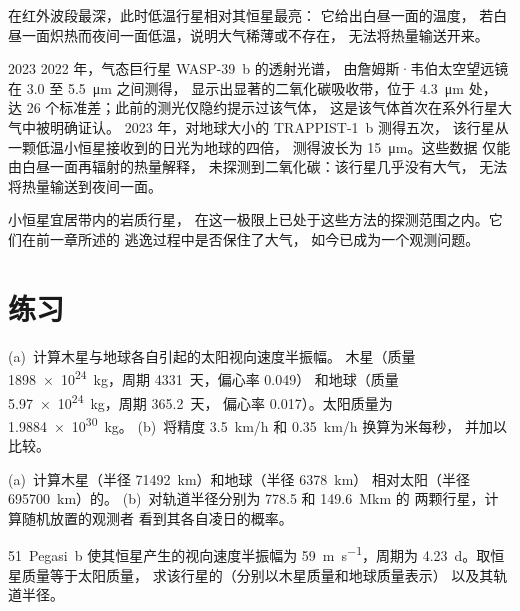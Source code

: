 在红外波段最深，此时低温行星相对其恒星最亮：
它给出白昼一面的温度，
若白昼一面炽热而夜间一面低温，说明大气稀薄或不存在，
无法将热量输送开来。

\begin{dated}{2023}
2022 年，气态巨行星 WASP-39~b 的透射光谱，
由詹姆斯·韦伯太空望远镜在 3.0 至 \qty{5.5}{\micro m} 之间测得，
显示出显著的二氧化碳吸收带，位于 \qty{4.3}{\micro m} 处，
达 26 个标准差；此前的测光仅隐约提示过该气体，
这是该气体首次在系外行星大气中被明确证认。
2023 年，对地球大小的 TRAPPIST-1~b 测得五次，
该行星从一颗低温小恒星接收到的日光为地球的四倍，
测得波长为 \qty{15}{\micro m}。这些数据
仅能由白昼一面再辐射的热量解释，
未探测到二氧化碳：该行星几乎没有大气，
无法将热量输送到夜间一面。
\end{dated}

小恒星宜居带内的岩质行星，
在这一极限上已处于这些方法的探测范围之内。它们在前一章所述的
逃逸过程中是否保住了大气，
如今已成为一个观测问题。

\section{练习}

\begin{exercise}[$\star$]\label{exo:b3:exoplanets:1}
(a)~计算木星与地球各自引起的太阳视向速度半振幅。
木星（质量 \qty{1898e24}{kg}，周期 \num{4331}~天，偏心率 0.049）
和地球（质量 \qty{5.97e24}{kg}，周期 \num{365.2}~天，
偏心率 0.017）。太阳质量为 \qty{1.9884e30}{kg}。
(b)~将精度 \qty{3.5}{km/h} 和 \qty{0.35}{km/h} 换算为米每秒，
并加以比较。
\end{exercise}

\begin{exercise}[$\star$]\label{exo:b3:exoplanets:2}
(a)~计算木星（半径 \qty{71492}{km}）和地球（半径 \qty{6378}{km}）
相对太阳（半径 \qty{695700}{km}）的。
(b)~对轨道半径分别为 \num{778.5} 和 \qty{149.6}{\mega km} 的
两颗行星，计算随机放置的观测者
看到其各自凌日的概率。
\end{exercise}

\begin{exercise}[$\star$]\label{exo:b3:exoplanets:3}
51~Pegasi~b 使其恒星产生的视向速度半振幅为
\qty{59}{m.s^{-1}}，周期为 \qty{4.23}{d}。取恒星质量等于太阳质量，
求该行星的（分别以木星质量和地球质量表示）
以及其轨道半径。
\end{exercise}

